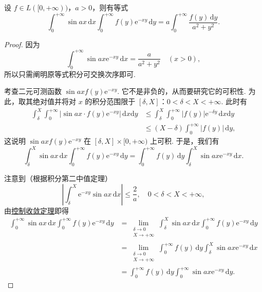 \documentclass[../../main.tex]{subfiles}%
\begin{document}
\begin{example}
设 \( f \in L([0, +\infty)) \)，\( a > 0 \)，则有等式
\[
\int_0^{+\infty} \sin ax \, \mathrm{d}x \int_0^{+\infty} f(y) \mathrm{e}^{-xy} \, \mathrm{d}y = a \int_0^{+\infty} \frac{f(y) \, \mathrm{d}y}{a^2 + y^2}.
\]
\end{example}
\begin{proof}

因为
\[
\int_0^{+\infty} \sin ax \mathrm{e}^{-xy} \, \mathrm{d}x = \frac{a}{a^2 + y^2} \quad (x > 0),
\]
所以只需阐明原等式积分可交换次序即可.

考查二元可测函数 \( \sin ax f(y) \mathrm{e}^{-xy} \). 它不是非负的，从而要研究它的可积性. 为此，取其绝对值并将对 \( x \) 的积分范围限于 \( [\delta, X] \)：\( 0 < \delta < X < +\infty \). 此时有
\begin{align*}
\int_{\delta}^{X} \int_0^{+\infty} |\sin ax \cdot f(y) \mathrm{e}^{-xy}| \, \mathrm{d}x\mathrm{d}y &\leqslant \int_{\delta}^{X} \int_0^{+\infty} |f(y)| \mathrm{e}^{-\delta y} \, \mathrm{d}x\mathrm{d}y \\
&\leqslant (X - \delta) \int_0^{+\infty} |f(y)| \, \mathrm{d}y,
\end{align*}
这说明 \( \sin ax f(y) \mathrm{e}^{-xy} \) 在 \( [\delta, X] \times [0, +\infty) \) 上可积. 于是，我们有
\[
\int_{\delta}^{X} \sin ax \, \mathrm{d}x \int_0^{+\infty} f(y) \mathrm{e}^{-xy} \, \mathrm{d}y = \int_0^{+\infty} f(y) \, \mathrm{d}y \int_{\delta}^{X} \sin ax \mathrm{e}^{-xy} \, \mathrm{d}x.
\]

注意到（根据积分第二中值定理）
\[
\left| \int_{\delta}^{X} \mathrm{e}^{-xy} \sin ax \, \mathrm{d}x \right| \leqslant \frac{2}{a}, \quad 0 < \delta < X < +\infty,
\]
由\hyperref[theorem:控制收敛定理]{控制收敛定理}即得
\begin{align*}
\int_0^{+\infty} \sin ax \, \mathrm{d}x \int_0^{+\infty} f(y) \mathrm{e}^{-xy} \, \mathrm{d}y &= \lim_{\substack{\delta \to 0 \\ X \to +\infty}} \int_{\delta}^{X} \sin ax \, \mathrm{d}x \int_0^{+\infty} f(y) \mathrm{e}^{-xy} \, \mathrm{d}y \\
&= \lim_{\substack{\delta \to 0 \\ X \to +\infty}} \int_0^{+\infty} f(y) \, \mathrm{d}y \int_{\delta}^{X} \sin ax \mathrm{e}^{-xy} \, \mathrm{d}x \\
&= \int_0^{+\infty} f(y) \, \mathrm{d}y \int_0^{+\infty} \sin ax \mathrm{e}^{-xy} \, \mathrm{d}y.
\end{align*}

\end{proof}
\end{document}
